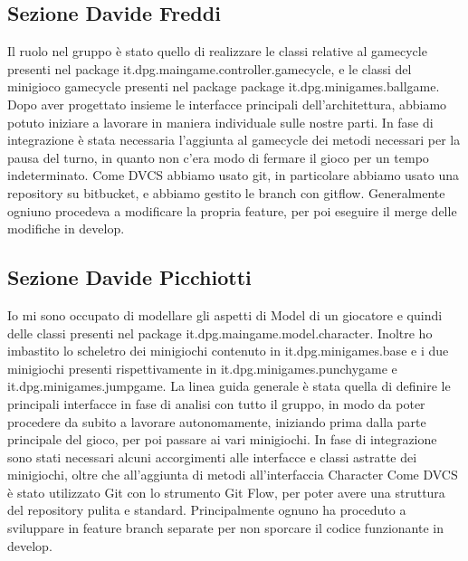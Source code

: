 \documentclass[a4paper,12pt]{report}
\begin{document}
	\subsection{Sezione Davide Freddi}

	Il ruolo nel gruppo è stato quello di realizzare le classi relative al gamecycle presenti nel package it.dpg.maingame.controller.gamecycle, e le classi del minigioco gamecycle presenti nel package package it.dpg.minigames.ballgame.
    Dopo aver progettato insieme le interfacce principali dell'architettura, abbiamo potuto iniziare a lavorare in maniera individuale sulle nostre parti.
    In fase di integrazione è stata necessaria l'aggiunta al gamecycle dei metodi necessari per la pausa del turno, in quanto non c'era modo di fermare il gioco per un tempo indeterminato.
    Come DVCS abbiamo usato git, in particolare abbiamo usato una repository su bitbucket, e abbiamo gestito le branch con gitflow.
    Generalmente ogniuno procedeva a modificare la propria feature, per poi eseguire il merge delle modifiche in develop.

	\subsection{Sezione Davide Picchiotti}

    Io mi sono occupato di modellare gli aspetti di Model di un giocatore e quindi delle classi presenti nel package it.dpg.maingame.model.character.\newline
    Inoltre ho imbastito lo scheletro dei minigiochi contenuto in it.dpg.minigames.base e i due minigiochi presenti rispettivamente in it.dpg.minigames.punchygame e it.dpg.minigames.jumpgame.\newline
    La linea guida generale è stata quella di definire le principali interfacce in fase di analisi con tutto il gruppo, in modo da poter procedere da subito a lavorare autonomamente,
    iniziando prima dalla parte principale del gioco, per poi passare ai vari minigiochi.\newline
    In fase di integrazione sono stati necessari alcuni accorgimenti alle interfacce e classi astratte dei minigiochi, oltre che all'aggiunta di metodi all'interfaccia Character\newline
    Come DVCS è stato utilizzato Git con lo strumento Git Flow, per poter avere una struttura del repository pulita e standard.
    Principalmente ognuno ha proceduto a sviluppare in feature branch separate per non sporcare il codice funzionante in develop.
\end{document}
